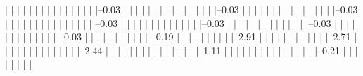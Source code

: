             |          |          |          |          |          |          |          |          
            |          |          |          |          |          |          |          |--0.03%
            |          |          |          |          |          |          |          |          
            |          |          |          |          |          |          |          |--0.03%
            |          |          |          |          |          |          |          |          
            |          |          |          |          |          |          |          |--0.03%
            |          |          |          |          |          |          |          |          
            |          |          |          |          |          |          |           --0.03%
            |          |          |          |          |          |          |          
            |          |          |          |          |          |          |--0.03%
            |          |          |          |          |          |          |          
            |          |          |          |          |          |          |--0.03%
            |          |          |          |          |          |          |          
            |          |          |          |          |          |           --0.03%
            |          |          |          |          |          |          
            |          |          |          |          |           --0.19%
            |          |          |          |          |          
            |          |          |          |          |--2.91%
            |          |          |          |          |          |          
            |          |          |          |          |          |--2.71%
            |          |          |          |          |          |          |          
            |          |          |          |          |          |          |--2.44%
            |          |          |          |          |          |          |          |          
            |          |          |          |          |          |          |          |--1.11%
            |          |          |          |          |          |          |          |          
            |          |          |          |          |          |          |          |--0.21%
            |          |          |          |          |          |          |          |          
